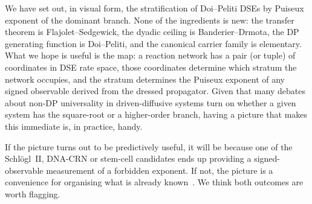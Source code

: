 \documentclass[11pt,a4paper]{article}
\theoremstyle{plain}
\theoremstyle{remark}
\begin{document}
We have set out, in visual form, the stratification of
Doi--Peliti DSEs by Puiseux exponent of the dominant branch.
None of the ingredients is new: the transfer theorem is
Flajolet--Sedgewick, the dyadic ceiling is Banderier--Drmota,
the DP generating function is Doi--Peliti, and the canonical
carrier family is elementary.  What we hope is useful is the
map: a reaction network has a pair (or tuple) of coordinates in
DSE rate space, those coordinates determine which stratum the
network occupies, and the stratum determines the Puiseux
exponent of any signed observable derived from the dressed
propagator.  Given that many debates about non-DP universality
in driven-diffusive systems turn on whether a given system has
the square-root or a higher-order branch, having a picture that
makes this immediate is, in practice, handy.

If the picture turns out to be predictively useful, it will be
because one of the Schlögl~II, DNA-CRN or stem-cell candidates
ends up providing a signed-observable measurement of a
forbidden exponent.  If not, the picture is a
convenience for organising what is already
known~\citep{FlajoletSedgewick,BanderierDrmota2015}.  We think
both outcomes are worth flagging.
\end{document}
